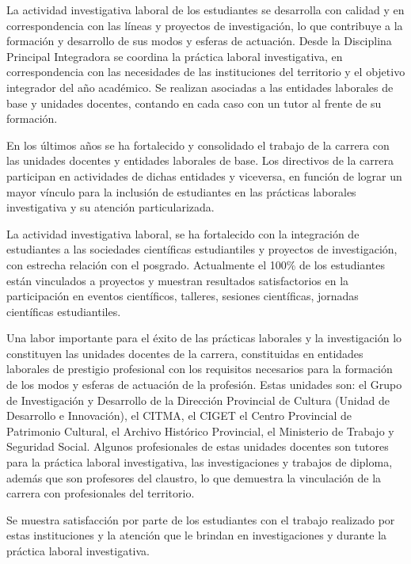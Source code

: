 La actividad investigativa laboral de los estudiantes se desarrolla con calidad y en correspondencia con las líneas y proyectos de investigación, lo que contribuye a la formación y desarrollo de sus modos y esferas de actuación. Desde la Disciplina Principal Integradora se coordina la práctica laboral investigativa, en correspondencia con las necesidades de las instituciones del territorio y el objetivo integrador del año académico. Se realizan asociadas a las entidades laborales de base y unidades docentes, contando en cada caso con un tutor al frente de su formación.

En los últimos años se ha fortalecido y consolidado el trabajo de la carrera con las unidades docentes y entidades laborales de base. Los directivos de la carrera participan en actividades de dichas entidades y viceversa, en función de lograr un mayor vínculo para la inclusión de estudiantes en las prácticas laborales investigativa y su atención particularizada. 

La actividad investigativa laboral, se ha fortalecido con la integración de estudiantes a las sociedades científicas estudiantiles y proyectos de investigación, con estrecha relación con el posgrado. Actualmente el 100\% de los estudiantes están vinculados a proyectos y muestran resultados satisfactorios en la participación en eventos científicos, talleres, sesiones científicas, jornadas científicas estudiantiles.

Una labor importante para el éxito de las prácticas laborales y la investigación lo constituyen las unidades docentes de la carrera, constituidas en entidades laborales de prestigio profesional con los requisitos necesarios para la formación de los modos y esferas de actuación de la profesión. Estas unidades son: el Grupo de Investigación y Desarrollo de la Dirección Provincial de Cultura (Unidad de Desarrollo e Innovación), el CITMA, el CIGET el Centro Provincial de Patrimonio Cultural, el Archivo Histórico Provincial, el Ministerio de Trabajo y Seguridad Social. Algunos profesionales de estas unidades docentes son tutores para la práctica laboral investigativa, las investigaciones y trabajos de diploma, además que son profesores del claustro, lo que demuestra la vinculación de la carrera con profesionales del territorio.

Se muestra satisfacción por parte de los estudiantes con el trabajo realizado por estas instituciones y la atención que le brindan en investigaciones y durante la práctica laboral investigativa.